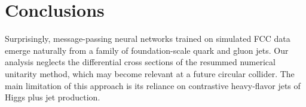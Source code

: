 \section{Conclusions}\label{sec:conclusions}

Surprisingly, message-passing neural networks trained on simulated FCC
data emerge naturally from a family of foundation-scale quark and gluon
jets. Our analysis neglects the differential cross sections of the
resummed numerical unitarity method, which may become relevant at a
future circular collider. The main limitation of this approach is its
reliance on contrastive heavy-flavor jets of Higgs plus jet production.

